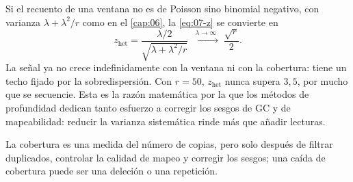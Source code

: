 \begin{profundizacion}
Si el recuento de una ventana no es de Poisson sino binomial negativo, con varianza $\lambda+\lambda^2/r$ como en el \cref{cap:06}, la \cref{eq:07-z} se convierte en
\[
z_{\text{het}} = \frac{\lambda/2}{\sqrt{\lambda+\lambda^{2}/r}} \;\xrightarrow{\;\lambda\to\infty\;}\; \frac{\sqrt r}{2}.
\]
La señal ya no crece indefinidamente con la ventana ni con la cobertura: tiene un techo fijado por la sobredispersión. Con $r=50$, $z_{\text{het}}$ nunca supera $3{,}5$, por mucho que se secuencie. Esta es la razón matemática por la que los métodos de profundidad dedican tanto esfuerzo a corregir los sesgos de GC y de mapeabilidad: reducir la varianza sistemática rinde más que añadir lecturas.
\end{profundizacion}

\begin{ideaclave}
La cobertura es una medida del número de copias, pero solo después de filtrar duplicados, controlar la calidad de mapeo y corregir los sesgos; una caída de cobertura puede ser una deleción o una repetición.
\end{ideaclave}

